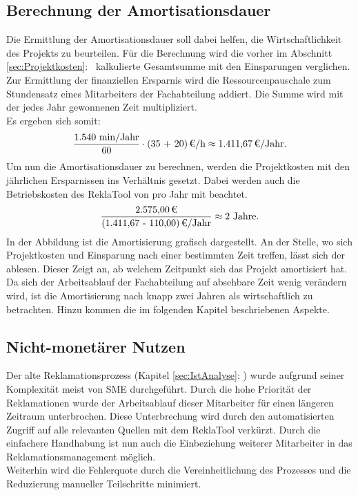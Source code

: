 \subsection*{Berechnung der Amortisationsdauer}
Die Ermittlung der Amortisationsdauer soll dabei helfen, die Wirtschaftlichkeit des Projekts zu beurteilen.
Für die Berechnung wird die vorher im Abschnitt  \ref{sec:Projektkosten}:~ kalkulierte Gesamtsumme 
mit den Einsparungen verglichen. 
Zur Ermittlung der finanziellen Ersparnis wird die Ressourcenpauschale zum Stundensatz eines Mitarbeiters der Fachabteilung 
addiert. Die Summe wird mit der jedes Jahr gewonnenen Zeit multipliziert. \\
Es ergeben sich somit:
\begin{eqnarray}
    \frac{1.540 \mbox{ min/Jahr}}{60} \cdot \eur{(35 + 20)}\mbox{/h} \approx \eur{1.411,67}\mbox{/Jahr}. 
\end{eqnarray}
Um nun die Amortisationsdauer zu berechnen, werden die Projektkosten mit den jährlichen Ersparnissen ins Verhältnis gesetzt.
Dabei werden auch die Betriebskosten des ReklaTool von  pro Jahr mit beachtet.
\begin{eqnarray}
    \frac{\eur{2.575,00}}{\eur{(1.411,67 - 110,00)}\mbox{/Jahr}} \approx 2 \mbox{ Jahre}.	
\end{eqnarray}
In der Abbildung  ist die Amortisierung grafisch dargestellt.
An der Stelle, wo sich Projektkosten und Einsparung nach einer bestimmten Zeit treffen, lässt sich der
 ablesen. Dieser Zeigt an, ab welchem Zeitpunkt sich das Projekt amortisiert hat.\\
Da sich der Arbeitsablauf der Fachabteilung auf absehbare Zeit wenig verändern wird, ist die Amortisierung nach knapp zwei
Jahren als wirtschaftlich zu betrachten. Hinzu kommen die im folgenden Kapitel beschriebenen Aspekte.

\subsection{Nicht-monetärer Nutzen}
\label{sec:nichtMonetaererNutzen}
Der alte Reklamationsprozess (\Vgl Kapitel \ref{sec:IstAnalyse}: ) wurde aufgrund seiner Komplexität
meist von \ac{SME} durchgeführt. Durch die hohe Priorität der Reklamationen wurde der Arbeitsablauf dieser Mitarbeiter für 
einen längeren Zeitraum unterbrochen. Diese Unterbrechung wird durch den automatisierten Zugriff auf alle relevanten Quellen mit 
dem ReklaTool verkürzt. Durch die einfachere Handhabung ist nun auch die Einbeziehung weiterer Mitarbeiter in das 
Reklamationsmanagement möglich.\\
Weiterhin wird die Fehlerquote durch die Vereinheitlichung des Prozesses und die Reduzierung manueller Teilschritte 
minimiert. 

